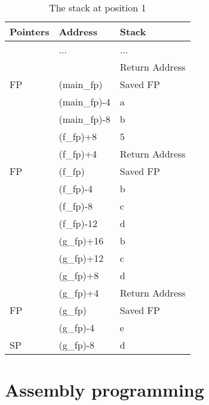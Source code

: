 \documentclass[paper=a4, fontsize=11pt]{scrartcl} %
\numberwithin{equation}{section} %
\numberwithin{figure}{section} %
\numberwithin{table}{section} %
\begin{document}
\begin{table}[ht!]
    \begin{tabular}{lll}
    Pointers & Address     & Stack          \\
    \hline
    ~        & ...         & ...            \\
    ~        & ~           & Return Address \\
    FP       & (main\_fp)  & Saved FP       \\
    ~        & (main\_fp)-4 & a              \\
    ~        & (main\_fp)-8 & b              \\
    ~        & (f\_fp)+8   & 5              \\
    ~        & (f\_fp)+4   & Return Address \\
    FP       & (f\_fp)     & Saved FP       \\
    ~        & (f\_fp)-4   & b              \\
    ~        & (f\_fp)-8   & c              \\
    ~        & (f\_fp)-12  & d              \\
    ~        & (g\_fp)+16  & b              \\
    ~        & (g\_fp)+12  & c              \\
    ~        & (g\_fp)+8   & d              \\
    ~        & (g\_fp)+4   & Return Address \\
    FP       & (g\_fp)     & Saved FP       \\
    ~        & (g\_fp)-4   & e              \\
    SP       & (g\_fp)-8   & d              \\
    \end{tabular}
    \caption{The stack at position 1}
\end{table}

\section{Assembly programming}

\end{document}
